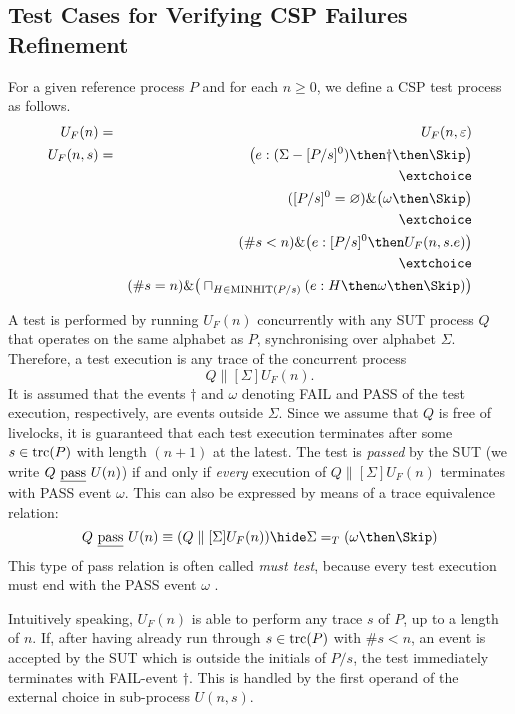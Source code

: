 \subsection{Test Cases for Verifying CSP Failures Refinement}

For a given reference process $P$ and for each $n\ge 0$, 
we define a CSP test process as follows. 
\begin{eqnarray}
U_F(n) & = & U_F(n,\varepsilon)
\\
U_F(n,s) & = & \big( e:(\Sigma - [P/s]^0) \then \dag\then \Skip \big)
\label{eq:ufa}
\\ & & \extchoice \nonumber
\\ & & ([P/s]^0 = \varnothing)    \&   \big( \omega \then \Skip \big)
\label{eq:ufb}
\\ & & \extchoice \nonumber
\\ & & (\#s < n) \& \big( e:[P/s]^0 \then U_F(n,s.e) \big)
\label{eq:ufc}
\\ & & \extchoice \nonumber
\\ & & (\#s = n) \& \big( \sqcap_{H\in\text{MINHIT}(P/s)} ( e:H \then \omega \then\Skip   )  \big)
\label{eq:ufd}
\end{eqnarray}

A test is performed by running $U_F(n)$ concurrently with any SUT process $Q$
that operates on the same alphabet as $P$, synchronising over
alphabet $\Sigma$. Therefore, a test execution is any trace of the concurrent process
\[
Q\parallel[\Sigma] U_F(n).
\]
It is assumed that the events $\dag$ and $\omega$ denoting FAIL and PASS of the test execution, respectively, are events outside $\Sigma$.
Since we assume that $Q$ is free of livelocks, it is guaranteed that each test execution terminates after some $s\in\text{trc}(P)$ with length $(n+1)$ at the latest. 
The test is \emph{passed} by the SUT (we write $Q\ \underline{\text{pass}}\ U(n)$) if and only if {\it every} execution of $Q\parallel[\Sigma] U_F(n)$ terminates with PASS event $\omega$. This can also be  expressed by means of a trace equivalence relation:
\[
Q\ \pass\ U(n) \equiv  (Q\parallel[\Sigma] U_F(n)) \hide \Sigma =_T (\omega\then\Skip)
\]
This type of pass relation is often called \emph{must test}, because every test execution must end with the PASS event $\omega$ \cite{Hennessy:1988:ATP:50497}.


Intuitively speaking, $U_F(n)$ is able to perform any trace $s$ of $P$, 
up to a length of $n$. If, after having already run through $s\in\text{trc}(P)$ with $\#s < n$,
an event is accepted by the SUT which is outside the initials of $P/s$, the test 
immediately terminates with FAIL-event $\dag$. This is handled by the first operand of the
external choice in sub-process $U(n,s)$.

